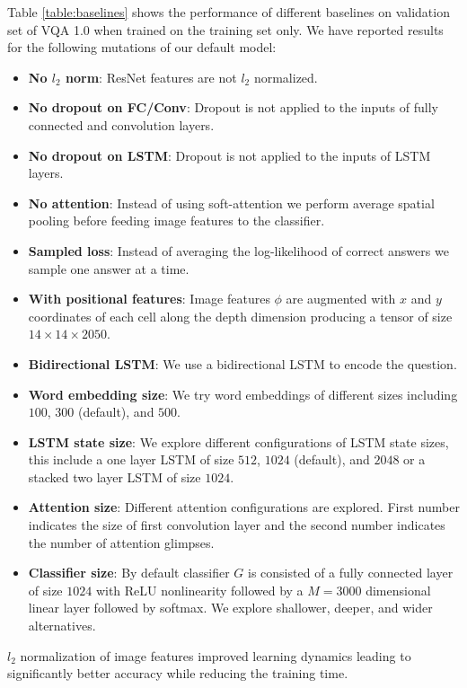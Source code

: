 \documentclass[10pt,twocolumn,letterpaper]{article}
\begin{document}
Table \ref{table:baselines} shows the performance of different baselines on validation set of VQA 1.0 \cite{Antol2015VQAVQ} when trained on the training set only. We have reported results for the following mutations of our default model:
\begin{itemize}
	\item \textbf{No $l_2$ norm}: ResNet features are not $l_2$ normalized.
	\item \textbf{No dropout on FC/Conv}: Dropout is not applied to the inputs of fully connected and convolution layers.
	\item \textbf{No dropout on LSTM}: Dropout is not applied to the inputs of LSTM layers.
	\item \textbf{No attention}: Instead of using soft-attention we perform average spatial pooling before feeding image features to the classifier.
	\item \textbf{Sampled loss}: Instead of averaging the log-likelihood of correct answers we sample one answer at a time.	
	\item \textbf{With positional features}: Image features $\phi$ are augmented with $x$ and $y$ coordinates of each cell along the depth dimension producing a tensor of size $14 \times 14 \times 2050$.
	\item \textbf{Bidirectional LSTM}: We use a bidirectional LSTM to encode the question.	
	\item \textbf{Word embedding size}: We try word embeddings of different sizes including $100$, $300$ (default), and $500$.
	\item \textbf{LSTM state size}: We explore different configurations of LSTM state sizes, this include a one layer LSTM of size $512$, $1024$ (default), and $2048$ or a stacked two layer LSTM of size $1024$.
	\item \textbf{Attention size}: Different attention configurations are explored. First number indicates the size of first convolution layer and the second number indicates the number of attention glimpses.
	\item \textbf{Classifier size}: By default classifier $G$ is consisted of a fully connected layer of size $1024$ with ReLU nonlinearity followed by a $M = 3000$ dimensional linear layer followed by softmax. We explore shallower, deeper, and wider alternatives.
\end{itemize}

$l_2$ normalization of image features improved learning dynamics leading to significantly better accuracy while reducing the training time.
\end{document}
